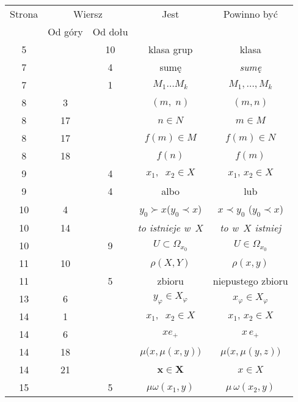 \documentclass[a4paper,11pt]{article}
\numberwithin{equation}{section}
\begin{document}
\newpage



\begin{center}

  \begin{tabular}{|c|c|c|c|c|}
    \hline
    Strona & \multicolumn{2}{c|}{Wiersz} & Jest
                              & Powinno być \\ \cline{2-3}
    & Od góry & Od dołu & & \\
    \hline
    5   & & 10 & klasa grup & klasa \\
    7   & &  4 & sumę & \textit{sumę} \\
    7   & &  1 & $M_{ 1 } \ldots M_{ k }$ & $M_{ 1 }, \ldots, M_{ k }$ \\
    8   &  3 & & $( m,\; n )$ & $( m, n )$ \\
    8   & 17 & & $n \in N$ & $m \in M$ \\
    8   & 17 & & $f( m ) \in M$ & $f( m ) \in N$ \\
    8   & 18 & & $f( n )$ & $f( m )$ \\
    9   & &  4 & $x_{ 1 },\;\; x_{ 2 } \in X$ & $x_{ 1 },\, x_{ 2 } \in X$ \\
    9   & &  4 & albo & lub \\
    10  &  4 & & $y_{ 0 } \succ x$($y_{ 0 } \prec x$)
           & $x \prec y_{ 0 }$ ($y_{ 0 } \prec x$) \\
    10  & 14 & & \textit{to istnieje w~$X$} & \textit{to w~$X$ istniej} \\
    10  & &  9 & $U \subset \Omega_{ x_{ 0 } }$ & $U \in \Omega_{ x_{ 0 } }$ \\
    11  & 10 & & $\rho( X, Y )$ & $\rho( x, y )$ \\
    11  & &  5 & zbioru & niepustego zbioru \\
    13  &  6 & & $y_{ \varphi } \in X_{ \varphi }$ & $x_{ \varphi } \in X_{ \varphi }$ \\
    14  &  1 & & $x_{ 1 },\;\; x_{ 2 } \in X$ & $x_{ 1 },\, x_{ 2 } \in X$ \\
    14  &  6 & & $x e_{ + }$ & $x \, e_{ + }$ \\
    14  & 18 & & $\mu\big( x, \mu( x, y ) \big)$
           & $\mu\big( x, \mu( y, z ) \big)$ \\
    14  & 21 & & $\mathbf{x} \in \mathbf{X}$ & $x \in X$ \\
    15  & &  5 & $\mu \omega( x_{ 1 }, y )$ & $\mu \, \omega( x_{ 2 }, y )$ \\

\end{tabular}
\end{center}
\end{document}
